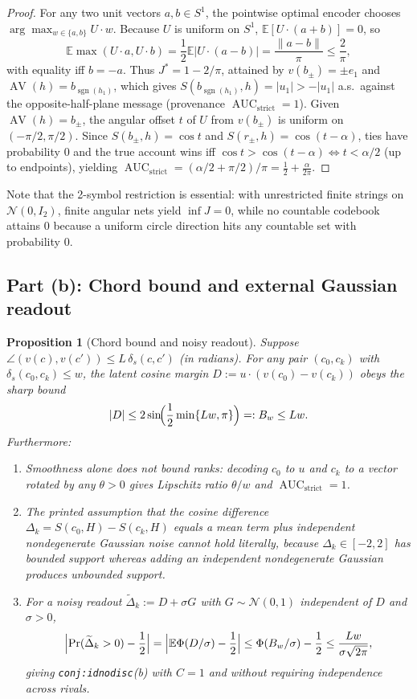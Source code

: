\documentclass[11pt]{article}
\theoremstyle{plain}
\newtheorem{proposition}[theorem]{Proposition}
\theoremstyle{definition}
\theoremstyle{remark}
\DeclareMathOperator{\AUC}{AUC}
\DeclareMathOperator{\AV}{AV}
\DeclareMathOperator{\sgn}{sgn}
\begin{document}
\begin{proof}
For any two unit vectors $a, b \in S^1$, the pointwise optimal encoder chooses $\arg\max_{w \in \{a,b\}} U \cdot w$. Because $U$ is uniform on $S^1$, $\mathbb{E}[U \cdot (a+b)] = 0$, so
\[
\mathbb{E}\max(U \cdot a, U \cdot b)
= \frac{1}{2}\mathbb{E}|U \cdot (a - b)|
= \frac{\|a - b\|}{\pi} \le \frac{2}{\pi},
\]
with equality iff $b = -a$. Thus $J^* = 1 - 2/\pi$, attained by $v(b_\pm) = \pm e_1$ and $\AV(h) = b_{\sgn(h_1)}$, which gives $S(b_{\sgn(h_1)}, h) = |u_1| > -|u_1|$ a.s.\ against the opposite-half-plane message (provenance $\AUC_{\mathrm{strict}} = 1$). Given $\AV(h) = b_\pm$, the angular offset $t$ of $U$ from $v(b_\pm)$ is uniform on $(-\pi/2, \pi/2)$. Since $S(b_\pm, h) = \cos t$ and $S(r_\pm, h) = \cos(t - \alpha)$, ties have probability $0$ and the true account wins iff $\cos t > \cos(t - \alpha) \iff t < \alpha/2$ (up to endpoints), yielding $\AUC_{\mathrm{strict}} = (\alpha/2 + \pi/2)/\pi = \frac{1}{2} + \frac{\alpha}{2\pi}$.
\end{proof}

Note that the 2-symbol restriction is essential: with unrestricted finite strings on $\mathcal{N}(0, I_2)$, finite angular nets yield $\inf J = 0$, while no countable codebook attains $0$ because a uniform circle direction hits any countable set with probability $0$.

\subsection{Part (b): Chord bound and external Gaussian readout}

\begin{proposition}[Chord bound and noisy readout]\label{prop:lipschitz}
Suppose $\angle(v(c), v(c')) \le L\,\delta_s(c, c')$ (in radians). For any pair $(c_0, c_k)$ with $\delta_s(c_0, c_k) \le w$, the latent cosine margin $D := u \cdot (v(c_0) - v(c_k))$ obeys the sharp bound
\[
|D| \le 2\sin\!\Bigl(\frac{1}{2}\min\{Lw, \pi\}\Bigr) =: B_w \le Lw.
\]
Furthermore:
\begin{enumerate}[label=\textup{(\arabic*)},leftmargin=2em,itemsep=2pt]
\item Smoothness alone does not bound ranks: decoding $c_0$ to $u$ and $c_k$ to a vector rotated by any $\theta > 0$ gives Lipschitz ratio $\theta/w$ and $\AUC_{\mathrm{strict}} = 1$.
\item The printed assumption that the cosine difference $\Delta_k = S(c_0, H) - S(c_k, H)$ equals a mean term plus independent nondegenerate Gaussian noise cannot hold literally, because $\Delta_k \in [-2, 2]$ has bounded support whereas adding an independent nondegenerate Gaussian produces unbounded support.
\item For a noisy readout $\widetilde{\Delta}_k := D + \sigma G$ with $G \sim \mathcal{N}(0, 1)$ independent of $D$ and $\sigma > 0$,
\[
\Bigl|\Pr(\widetilde{\Delta}_k > 0) - \frac{1}{2}\Bigr|
= \Bigl|\mathbb{E}\Phi(D/\sigma) - \frac{1}{2}\Bigr|
\le \Phi(B_w/\sigma) - \frac{1}{2}
\le \frac{Lw}{\sigma\sqrt{2\pi}},
\]
giving \texttt{conj:idnodisc}(b) with $C = 1$ and without requiring independence across rivals.
\end{enumerate}
\end{proposition}
\end{document}
